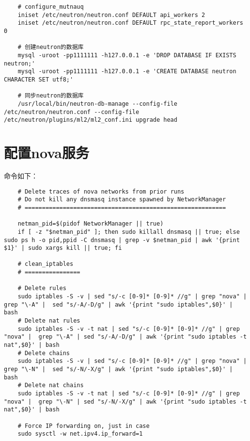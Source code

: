 \documentclass[a4paper,left=1.5cm,right=1.5cm,11pt]{article}
\begin{document}
\begin{lstlisting}
	# configure_mutnauq
	iniset /etc/neutron/neutron.conf DEFAULT api_workers 2
	iniset /etc/neutron/neutron.conf DEFAULT rpc_state_report_workers 0

	# 创建neutron的数据库
	mysql -uroot -pp1111111 -h127.0.0.1 -e 'DROP DATABASE IF EXISTS neutron;'
	mysql -uroot -pp1111111 -h127.0.0.1 -e 'CREATE DATABASE neutron CHARACTER SET utf8;'
	
	# 同步neutron的数据库
	/usr/local/bin/neutron-db-manage --config-file /etc/neutron/neutron.conf --config-file /etc/neutron/plugins/ml2/ml2_conf.ini upgrade head
	\end{lstlisting}

\section{配置nova服务}
	命令如下：
	\begin{lstlisting}
	# Delete traces of nova networks from prior runs
    # Do not kill any dnsmasq instance spawned by NetworkManager
	# ==========================================================

	netman_pid=$(pidof NetworkManager || true)
	if [ -z "$netman_pid" ]; then sudo killall dnsmasq || true; else sudo ps h -o pid,ppid -C dnsmasq | grep -v $netman_pid | awk '{print $1}' | sudo xargs kill || true; fi

	# clean_iptables
	# ================

	# Delete rules
    sudo iptables -S -v | sed "s/-c [0-9]* [0-9]* //g" | grep "nova" | grep "\-A" |  sed "s/-A/-D/g" | awk '{print "sudo iptables",$0}' | bash
    # Delete nat rules
    sudo iptables -S -v -t nat | sed "s/-c [0-9]* [0-9]* //g" | grep "nova" |  grep "\-A" | sed "s/-A/-D/g" | awk '{print "sudo iptables -t nat",$0}' | bash
    # Delete chains
    sudo iptables -S -v | sed "s/-c [0-9]* [0-9]* //g" | grep "nova" | grep "\-N" |  sed "s/-N/-X/g" | awk '{print "sudo iptables",$0}' | bash
    # Delete nat chains
    sudo iptables -S -v -t nat | sed "s/-c [0-9]* [0-9]* //g" | grep "nova" |  grep "\-N" | sed "s/-N/-X/g" | awk '{print "sudo iptables -t nat",$0}' | bash

	# Force IP forwarding on, just in case
    sudo sysctl -w net.ipv4.ip_forward=1
	\end{lstlisting}
\end{document}
